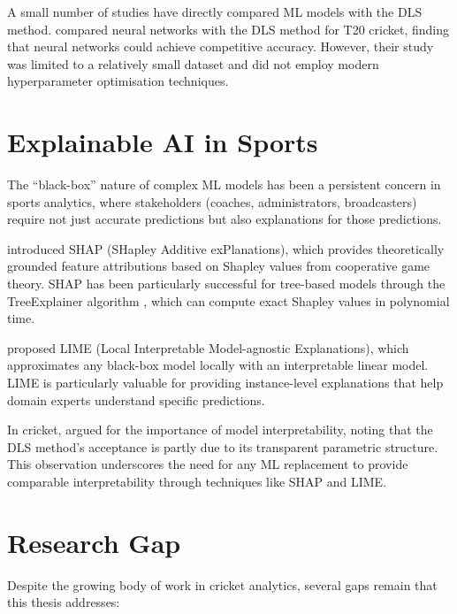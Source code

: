 \documentclass[12pt,a4paper,oneside]{report}
\begin{document}
A small number of studies have directly compared ML models with the DLS method. \citet{davis2015investigating} compared neural networks with the DLS method for T20 cricket, finding that neural networks could achieve competitive accuracy. However, their study was limited to a relatively small dataset and did not employ modern hyperparameter optimisation techniques.

\section{Explainable AI in Sports}

The ``black-box'' nature of complex ML models has been a persistent concern in sports analytics, where stakeholders (coaches, administrators, broadcasters) require not just accurate predictions but also explanations for those predictions.

\citet{lundberg2017unified} introduced SHAP (SHapley Additive exPlanations), which provides theoretically grounded feature attributions based on Shapley values from cooperative game theory. SHAP has been particularly successful for tree-based models through the TreeExplainer algorithm \citep{lundberg2020local}, which can compute exact Shapley values in polynomial time.

\citet{ribeiro2016should} proposed LIME (Local Interpretable Model-agnostic Explanations), which approximates any black-box model locally with an interpretable linear model. LIME is particularly valuable for providing instance-level explanations that help domain experts understand specific predictions.

In cricket, \citet{kampakis2015using} argued for the importance of model interpretability, noting that the DLS method's acceptance is partly due to its transparent parametric structure. This observation underscores the need for any ML replacement to provide comparable interpretability through techniques like SHAP and LIME.

\section{Research Gap}

Despite the growing body of work in cricket analytics, several gaps remain that this thesis addresses:
\end{document}
